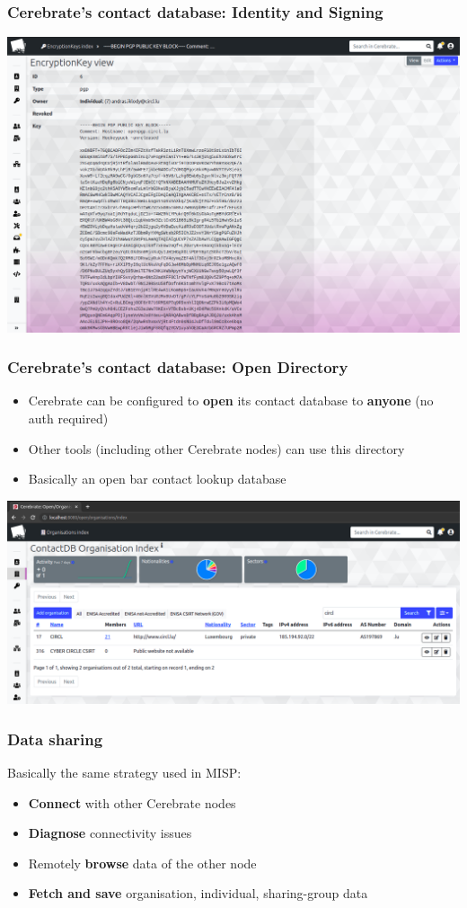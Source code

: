 \begin{frame}
\frametitle{Cerebrate's contact database: Identity and Signing}
    \begin{center}
        \includegraphics[width=0.95\linewidth]{pictures/pgp.png}
    \end{center}
\end{frame}

\begin{frame}
\frametitle{Cerebrate's contact database: Open Directory}
    \begin{itemize}
        \item Cerebrate can be configured to \textbf{open} its contact database to \textbf{anyone} (no auth required)
        \item Other tools (including other Cerebrate nodes) can use this directory
        \item Basically an open bar contact lookup database
    \end{itemize}
    \begin{center}
        \includegraphics[width=0.8\linewidth]{pictures/open-directory.png}
    \end{center}
\end{frame}

\begin{frame}
\frametitle{Data sharing}
Basically the same strategy used in MISP:
    \begin{itemize}
        \item \textbf{Connect} with other Cerebrate nodes
        \item \textbf{Diagnose} connectivity issues
        \item Remotely \textbf{browse} data of the other node
        \item \textbf{Fetch and save} organisation, individual, sharing-group data
    \end{itemize}
\end{frame}

